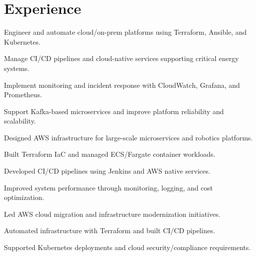\documentclass[letterpaper]{deedy-resume} %
\begin{document}
\begin{minipage}[t]{0.66\textwidth} %

\section{Experience}

\begin{tightitemize}
\sectionspace
\item Engineer and automate cloud/on-prem platforms using Terraform, Ansible, and Kubernetes.
\item Manage CI/CD pipelines and cloud-native services supporting critical energy systems.
\item Implement monitoring and incident response with CloudWatch, Grafana, and Prometheus.
\item Support Kafka-based microservices and improve platform reliability and scalability.
\end{tightitemize}

\sectionspace

\begin{tightitemize}
\item Designed AWS infrastructure for large-scale microservices and robotics platforms.
\item Built Terraform IaC and managed ECS/Fargate container workloads.
\item Developed CI/CD pipelines using Jenkins and AWS native services.
\item Improved system performance through monitoring, logging, and cost optimization.
\end{tightitemize}

\sectionspace

\begin{tightitemize}
\item Led AWS cloud migration and infrastructure modernization initiatives.
\item Automated infrastructure with Terraform and built CI/CD pipelines.
\item Supported Kubernetes deployments and cloud security/compliance requirements.
\end{tightitemize}


\end{minipage}
\end{document}
